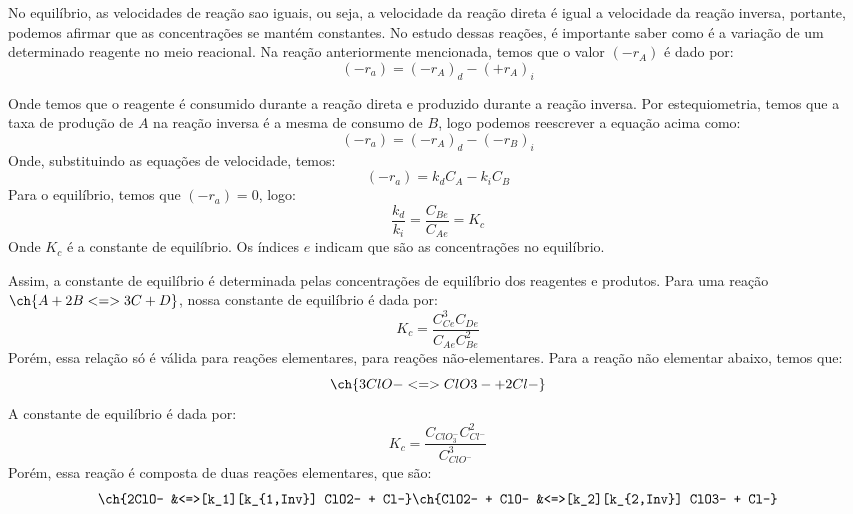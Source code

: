 No equilíbrio, as velocidades de reação sao iguais, ou seja, a velocidade da reação direta é igual a
velocidade da reação inversa, portante, podemos afirmar que as concentrações se mantém constantes.
No estudo dessas reações, é importante saber como é a variação de um determinado reagente no meio
reacional. Na reação anteriormente mencionada, temos que o valor \(\left( -r_{A}  \right) \) é dado
por:
\begin{equation}
    \left( -r_{a} \right) = \left( -r_A \right)_d - \left( +r_A \right)_i 
\end{equation}

Onde temos que o reagente é consumido durante a reação direta e produzido durante a reação inversa.
Por estequiometria, temos que a taxa de produção de \(A\) na reação inversa é a mesma de consumo de
\(B\), logo podemos reescrever a equação acima como:
\begin{equation}
    \left( -r_{a} \right) = \left( -r_A \right)_d - \left( -r_B \right)_i 
\end{equation}
Onde, substituindo as equações de velocidade, temos:
\begin{equation}
    \left( -r_{a} \right) = k_d C_A - k_i C_B
\end{equation}
Para o equilíbrio, temos que \(\left( -r_{a} \right) = 0\), logo:
\begin{equation}
    \frac{k_d}{k_i} = \frac{C_{Be} }{C_{Ae} } = K_c
\end{equation}
Onde \(K_c\) é a constante de equilíbrio. Os índices \(e\) indicam que são as concentrações no
equilíbrio. \par
Assim, a constante de equilíbrio é determinada pelas concentrações de equilíbrio dos reagentes e
produtos. Para uma reação \(\ch{A + 2B <=> 3C + D}\), nossa constante de equilíbrio é dada por:
\begin{equation*}
    K_c = \frac{C_{Ce}^3 C_{De} }{C_{Ae} C_{Be}^2}
\end{equation*} 
Porém, essa relação só é válida para reações elementares, para reações não-elementares. Para a
reação não elementar abaixo, temos que:
\begin{equation}
    \ch{3ClO- <=> ClO3- + 2Cl-}
\end{equation}
A constante de equilíbrio é dada por:
\begin{equation}
    K_c = \frac{C_{ClO_3^-} C_{Cl^-}^2}{C_{ClO^-}^3}
\end{equation}
Porém, essa reação é composta de duas reações elementares, que são:
\begin{align*}
    \ch{2ClO- &<=>[k_1][k_{1,Inv}] ClO2- + Cl-}
    \ch{ClO2- + ClO- &<=>[k_2][k_{2,Inv}] ClO3- + Cl-}
\end{align*}
